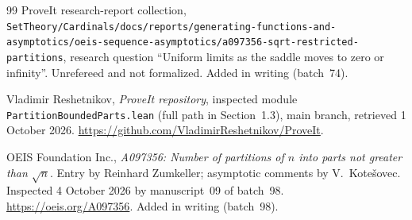 \documentclass[11pt]{article}
\theoremstyle{definition}
\theoremstyle{remark}
\numberwithin{equation}{section}
\begin{document}
\begin{thebibliography}{99}
ProveIt research-report collection,
\nolinkurl{SetTheory/Cardinals/docs/reports/generating-functions-and-asymptotics/oeis-sequence-asymptotics/a097356-sqrt-restricted-partitions},
research question ``Uniform limits as the saddle moves to zero or
infinity''. Unrefereed and not formalized. Added in writing (batch~74).

Vladimir Reshetnikov, \emph{ProveIt repository}, inspected module
\texttt{PartitionBoundedParts.lean} (full path in Section~1.3),
main branch, retrieved 1 October 2026.
\url{https://github.com/VladimirReshetnikov/ProveIt}.

OEIS Foundation Inc., \emph{A097356: Number of partitions of $n$ into parts
not greater than $\sqrt n$}. Entry by Reinhard Zumkeller; asymptotic
comments by V.~Kote\v{s}ovec. Inspected 4 October 2026 by manuscript~09 of
batch~98. \url{https://oeis.org/A097356}. Added in writing (batch~98).
\end{thebibliography}
\endgroup
\end{document}
